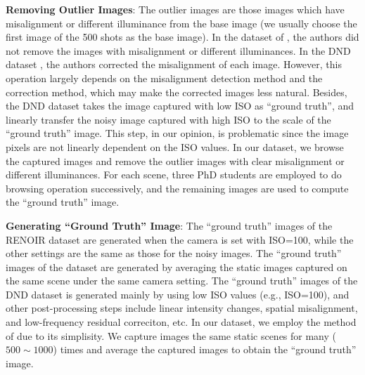 \textbf{Removing Outlier Images}: The outlier images are those images which have misalignment or different illuminance from the base image (we usually choose the first image of the 500 shots as the base image). In the dataset of \cite{crosschannel2016}, the authors did not remove the images with misalignment or different illuminances. In the DND dataset \cite{dnd2017}, the authors corrected the misalignment of each image. However, this operation largely depends on the misalignment detection method and the correction method, which may make the corrected images less natural. Besides, the DND dataset \cite{dnd2017} takes the image captured with low ISO as ``ground truth'', and linearly transfer the noisy image captured with high ISO to the scale of the ``ground truth'' image. This step, in our opinion, is problematic since the image pixels are not linearly dependent on the ISO values. In our dataset, we browse the captured images and remove the outlier images with clear misalignment or different illuminances. For each scene, three PhD students are employed to do browsing operation successively, and the remaining images are used to compute the ``ground truth'' image.
 


\textbf{Generating ``Ground Truth'' Image}: The ``ground truth'' images of the RENOIR dataset \cite{RENOIR2014} are generated when the camera is set with ISO=100, while the other settings are the same as those for the noisy images. The ``ground truth'' images of the dataset \cite{crosschannel2016} are generated by averaging the static images captured on the same scene under the same camera setting. The ``ground truth'' images of the DND dataset \cite{dnd2017} is generated mainly by using low ISO values (e.g., ISO=100), and other post-processing steps include linear intensity changes, spatial misalignment, and low-frequency residual correciton, etc. In our dataset, we employ the method of \cite{crosschannel2016} due to its simplisity. We capture images the same static scenes for many ($500\sim1000$) times and average the captured images to obtain the ``ground truth'' image. 

